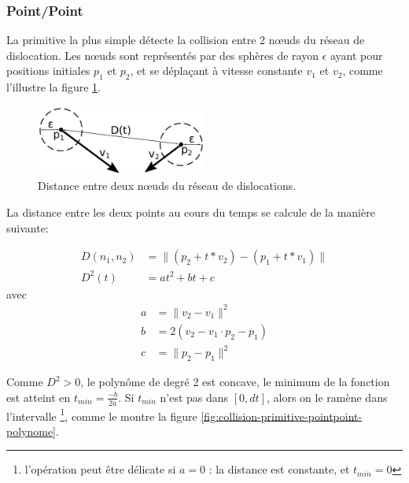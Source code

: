 \documentclass[11pt,class=article,float=false,crop=false]{standalone}
\begin{document}
\subsubsection{Point/Point}
\label{sec:detection-pointpoint}

La primitive la plus simple détecte la collision entre 2 nœuds du réseau de dislocation. Les nœuds sont représentés par des sphères de rayon $\epsilon$ ayant pour positions initiales $p_1$ et $p_2$, et se déplaçant à vitesse constante $v_1$ et $v_2$, comme l'illustre la figure \ref{fig:collision-primitive-pointpoint}.

\begin{figure}[H]
	\centering
	\includegraphics[width=0.5\textwidth]{img/collision-primitive-pointpoint}
	\caption{Distance entre deux nœuds du réseau de dislocations.}
	\label{fig:collision-primitive-pointpoint}
\end{figure}

La distance entre les deux points au cours du temps se calcule de la manière suivante: 

\begin{align}
	D(n_1,n_2) & = \|(p_2+t*v_2)-(p_1+t*v_1)\| \\
	D^2(t)       & = at^2 + bt + c 
\end{align}
avec
\begin{align}
	a & = \|v_2-v_1\|^2 \\
	b & = 2(v_2-v_1 \cdot p_2-p_1) \\
	c & = \|p_2-p_1\|^2
\end{align}

Comme $D^2 > 0$, le polynôme de degré 2 est concave, le minimum de la fonction est atteint en $t_{min} = \frac{-b}{2a}$. Si $t_{min}$ n'est pas dans $[0,dt]$, alors on le ramène dans l'intervalle \footnote{l'opération peut être délicate si $a=0$ : la distance est constante, et $t_{min}=0$}, comme le montre la figure \ref{fig:collision-primitive-pointpoint-polynome}.
\end{document}
